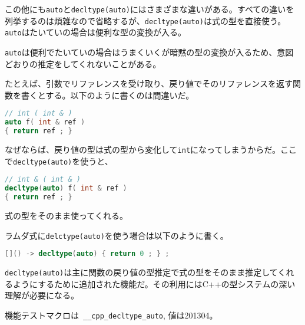 この他にも\lstinline!auto!と\lstinline!decltype(auto)!にはさまざまな違いがある。すべての違いを列挙するのは煩雑なので省略するが、\lstinline!decltype(auto)!は式の型を直接使う。\lstinline!auto!はたいていの場合は便利な型の変換が入る。

\lstinline!auto!は便利でたいていの場合はうまくいくが暗黙の型の変換が入るため、意図どおりの推定をしてくれないことがある。

たとえば、引数でリファレンスを受け取り、戻り値でそのリファレンスを返す関数を書くとする。以下のように書くのは間違いだ。

\begin{lstlisting}[language=C++]
// int ( int & )
auto f( int & ref )
{ return ref ; }
\end{lstlisting}

なぜならば、戻り値の型は式の型から変化して\lstinline!int!になってしまうからだ。ここで\lstinline!decltype(auto)!を使うと、

\begin{lstlisting}[language=C++]
// int & ( int & )
decltype(auto) f( int & ref )
{ return ref ; }
\end{lstlisting}

式の型をそのまま使ってくれる。

ラムダ式に\lstinline!delctype(auto)!を使う場合は以下のように書く。

\begin{lstlisting}[language=C++]
[]() -> decltype(auto) { return 0 ; } ;
\end{lstlisting}

\lstinline!decltype(auto)!は主に関数の戻り値の型推定で式の型をそのまま推定してくれるようにするために追加された機能だ。その利用にはC++の型システムの深い理解が必要になる。

機能テストマクロは~\lstinline!__cpp_decltype_auto!, 値は201304。
